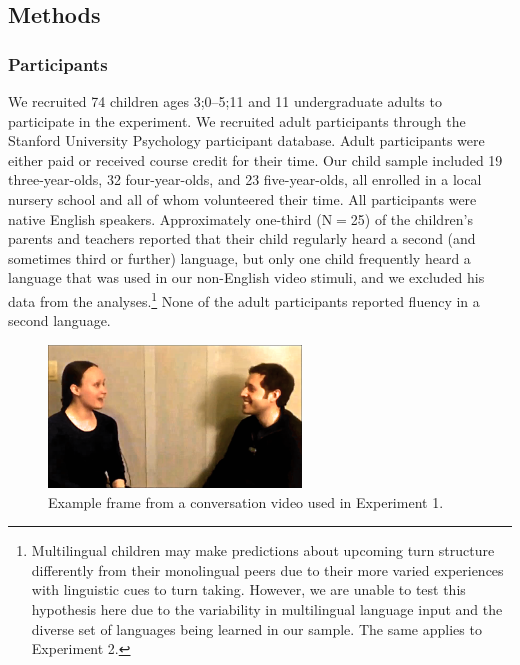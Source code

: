 \documentclass[authoryear, 12pt]{elsarticle}
\begin{document}
\subsection*{Methods}
\label{sec:methods1}

\subsubsection*{Participants}

We recruited 74 children ages 3;0--5;11 and 11 undergraduate adults to participate in the experiment. We recruited adult participants through the Stanford University Psychology participant database. Adult participants were either paid or received course credit for their time. Our child sample included 19 three-year-olds, 32 four-year-olds, and 23 five-year-olds, all enrolled in a local nursery school and all of whom volunteered their time. All participants were native English speakers. Approximately one-third (N$=$25) of the children's parents and teachers reported that their child regularly heard a second (and sometimes third or further) language, but only one child frequently heard a language that was used in our non-English video stimuli, and we excluded his data from the analyses.\footnote{Multilingual children may make predictions about upcoming turn structure differently from their monolingual peers due to their more varied experiences with linguistic cues to turn taking. However, we are unable to test this hypothesis here due to the variability in multilingual language input and the diverse set of languages being learned in our sample. The same applies to Experiment 2.} None of the adult participants reported fluency in a second language.

\begin{figure}[t]
\begin{center}
\includegraphics[width=0.6\textwidth]{figures/FIG-FL-stim.png}
\end{center}
\caption{Example frame from a conversation video used in Experiment 1.} 
\label{fig:speakers}
\end{figure}
\end{document}
